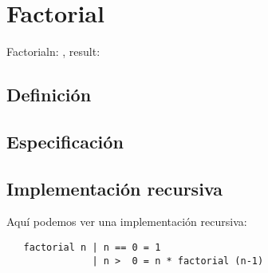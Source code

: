 \documentclass{article}
\begin{document}
\section{Factorial}


\begin{proc}{Factorial}{\In n: \ent, \Out result: \ent}{}
\end{proc}



\subsection{Definición}



\subsection{Especificación}


\subsection{Implementación recursiva}

Aquí podemos ver una implementación recursiva:

\begin{verbatim}
   factorial n | n == 0 = 1
               | n >  0 = n * factorial (n-1)
\end{verbatim}
\end{document}
